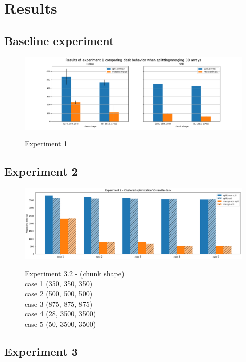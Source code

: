 \documentclass[conference]{IEEEtran}
\begin{document}
\section{Results}

\subsection{Baseline experiment}
\begin{figure}
  \centering
  \includegraphics[scale=0.5]{./figures/exp1_results.png}
  \label{fig:exp1}
  \caption{Experiment 1}
\end{figure}

\subsection{Experiment 2}
\begin{figure}
  \centering
  \includegraphics[scale=0.5]{./figures/exp2_results.png}
  \label{fig:exp2}
  \caption{Experiment 3.2  - (chunk shape)\\
  case 1 (350, 350, 350)\\
  case 2 (500, 500, 500)\\
  case 3 (875, 875, 875)\\
  case 4 (28, 3500, 3500)\\
  case 5 (50, 3500, 3500)\\
  }
\end{figure}

\subsection{Experiment 3}
\end{document}
